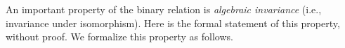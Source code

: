 An important property of the binary relation  is \emph{algebraic invariance} (i.e.,
invariance under isomorphism).
\ifshort
Here is the formal statement of this property, without proof.
\else
We formalize this property as follows.

\begin{code}%
\>[0]\<%
\\
\>[0]\AgdaSpace{}%
\AgdaModule{\AgdaUnderscore{}}\AgdaSpace{}%
\AgdaSymbol{\{}\AgdaSpace{}%
\AgdaSymbol{:}\AgdaSpace{}%
\AgdaSpace{}%
\AgdaSymbol{\}\{}\AgdaSpace{}%
\AgdaSymbol{:}\AgdaSpace{}%
\AgdaSpace{}%
\AgdaSpace{}%
\AgdaSymbol{\}(}\AgdaSpace{}%
\AgdaSymbol{:}\AgdaSpace{}%
\AgdaSpace{}%
\AgdaSpace{}%
\AgdaSymbol{)(}\AgdaSpace{}%
\AgdaSpace{}%
\AgdaSymbol{:}\AgdaSpace{}%
\AgdaSpace{}%
\AgdaSymbol{)}\AgdaSpace{}%
\<%
\end{code}
\fi
\begin{code}%
\>[0]\<%
\\
\>[0][@{}l@{\AgdaIndent{1}}]%
\>[1]\AgdaSpace{}%
\AgdaSymbol{:}\AgdaSpace{}%
\AgdaSpace{}%
\AgdaSpace{}%
\AgdaSpace{}%
\AgdaSpace{}%
%
\>[24]%
\>[27]\AgdaSpace{}%
\AgdaSpace{}%
%
\>[34]%
\>[37]\AgdaSpace{}%
\AgdaSpace{}%
\AgdaSpace{}%
\AgdaSpace{}%
\<%
\\
\>[0]\<%
\end{code}
\ifshort\else
